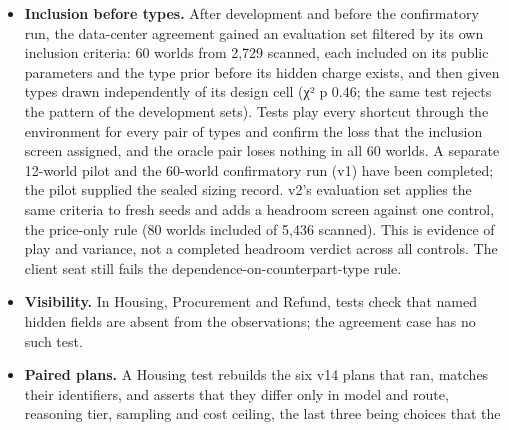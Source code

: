 \begin{itemize}
  runner. The replay certificate does not cover two headline measures.
  Housing's seat-0 measure is computed by case code over each episode's outcome, whereas the receipts' own scores
  total all six tenants; the derived analyses of Table 5.2 re-derived the measure from the sealed event logs, and we
  re-extracted and regenerated it exactly on 16 October. Procurement's original report read an unsealed action list
  through an unpinned reference. The reanalysis of 16 October audits all 144 receipts (96 under the final task prompt
  and 48 under the earlier one), reads the parsed actions from their sealed logs, and pins the extraction, the
  reference, the report and the case inputs. Every per-world loss and the intervals of Table E.14 reproduce. This is a
  separately verified derivation; we have not inserted decision loss into the original receipts. The Housing receipts
  also name the model for the five tenant seats that a script played; the true seat map is in an unsealed log.
\item
  \textbf{Inclusion before types.} After development and before the confirmatory run, the data-center agreement gained an
  evaluation set filtered by its own inclusion criteria: 60 worlds from 2,729 scanned, each included on its public
  parameters and the type prior before its hidden charge exists, and then given types drawn independently of its
  design cell (χ² p 0.46; the same test rejects the pattern of the development sets). Tests play every shortcut
  through the environment for every pair of types and confirm the loss that the inclusion screen assigned, and the
  oracle pair loses nothing in all 60 worlds. A separate 12-world pilot and the 60-world confirmatory run (v1) have
  been completed; the pilot supplied the sealed sizing record. v2's evaluation set applies the same criteria to fresh
  seeds and adds a headroom screen against one control, the price-only rule (80 worlds included of 5,436 scanned).
  This is evidence of play and variance, not a completed headroom verdict across all controls. The client seat still
  fails the dependence-on-counterpart-type rule.
\item
  \textbf{Visibility.} In Housing, Procurement and Refund, tests check that named hidden fields are absent from the
  observations; the agreement case has no such test.
\item
  \textbf{Paired plans.} A Housing test rebuilds the six v14 plans that ran, matches their identifiers, and asserts that
  they differ only in model and route, reasoning tier, sampling and cost ceiling, the last three being choices that the

\end{itemize}
